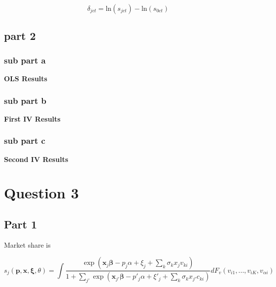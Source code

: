 \documentclass[11pt]{article}
\begin{document}
$$\delta_{jct} = \text{ln}(s_{jct}) - \text{ln}(s_{0ct})$$


\subsection{part 2}
\subsubsection{sub part a}

\begin{center}
	\centering
	\textbf{OLS Results}\par\medskip
	\scalebox{1}{
		
	}
\end{center}


\subsubsection{sub part b}

\begin{center}
	\centering
	\textbf{First IV Results}\par\medskip
	\scalebox{1}{
		
	}
\end{center}


\subsubsection{sub part c}
\begin{center}
	\centering
	\textbf{Second IV Results}\par\medskip
	\scalebox{1}{
		
	}
\end{center}



\section{Question 3}

\subsection{Part 1}

Market share is 

$$ s_j(\bm p, \bm x, \bm \xi, \theta) = 
\int \frac{\exp (\bm x_{j} \bm \beta - p_j\alpha + \xi_j + \sum_k \sigma_k x_j v_{ki})}
{1 + \sum_{j'} \exp(\bm x_{j'} \bm \beta - p'_j \alpha + \xi'_j + \sum_k \sigma_k x_{j'} c_{ki})}
dF_v(v_{i1}, ..., v_{iK}, v_{\alpha i})
$$
\end{document}
